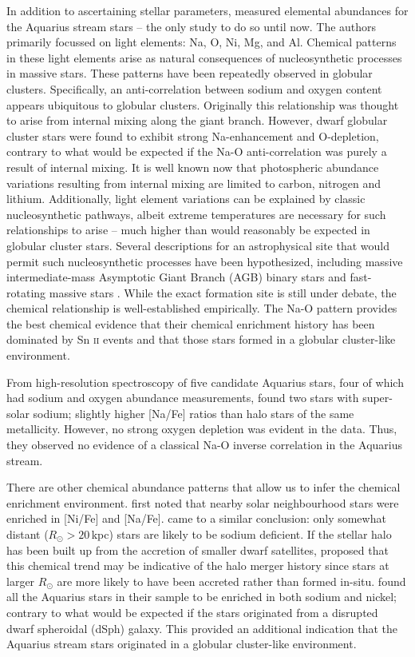\documentclass{emulateapj}
\begin{document}
In addition to ascertaining stellar parameters, \citet{wylie-de-boer;et-al_2012} measured elemental abundances for the Aquarius stream stars -- the only study to do so until now. The authors primarily focussed on light elements: Na, O, Ni, Mg, and Al. Chemical patterns in these light elements arise as natural consequences of nucleosynthetic processes in massive stars. These patterns have been repeatedly observed in globular clusters. Specifically, an anti-correlation between sodium and oxygen content appears ubiquitous to globular clusters. Originally this relationship was thought to arise from internal mixing along the giant branch. However, dwarf globular cluster stars were found to exhibit strong Na-enhancement and O-depletion, contrary to what would be expected if the Na-O anti-correlation was purely a result of internal mixing. It is well known now that photospheric abundance variations resulting from internal mixing are limited to carbon, nitrogen and lithium. Additionally, light element variations can be explained by classic nucleosynthetic pathways, albeit extreme temperatures are necessary for such relationships to arise \--- much higher than would reasonably be expected in globular cluster stars. Several descriptions for an astrophysical site that would permit such nucleosynthetic processes have been hypothesized, including massive intermediate-mass Asymptotic Giant Branch (AGB) binary stars \citep{de_mink;et-al_2009} and fast-rotating massive stars \citep{decressin;et-al_2007}. While the exact formation site is still under debate, the chemical relationship is well-established empirically. The Na-O pattern provides the best chemical evidence that their chemical enrichment history has been dominated by Sn \textsc{ii} events and that those stars formed in a globular cluster-like environment.

From high-resolution spectroscopy of five candidate Aquarius stars, four of which had sodium and oxygen abundance measurements, \citet{wylie-de-boer;et-al_2012} found two stars with super-solar sodium; slightly higher [Na/Fe] ratios than halo stars of the same metallicity. However, no strong oxygen depletion was evident in the data. Thus, they observed no evidence of a classical Na-O inverse correlation in the Aquarius stream.

There are other chemical abundance patterns that allow us to infer the chemical enrichment environment. \citet{nissen;schuster_1997} first noted that nearby solar neighbourhood stars were enriched in [Ni/Fe] and [Na/Fe]. \citet{fulbright_2000} came to a similar conclusion: only somewhat distant ($R_\odot > 20$\,kpc) stars are likely to be sodium deficient. If the stellar halo has been built up from the accretion of smaller dwarf satellites, \citet{nissen;schuster_1997} proposed that this chemical trend may be indicative of the halo merger history since stars at larger $R_\odot$ are more likely to have been accreted rather than formed in-situ. \citet{wylie-de-boer;et-al_2012} found all the Aquarius stars in their sample to be enriched in both sodium and nickel; contrary to what would be expected if the stars originated from a disrupted dwarf spheroidal (dSph) galaxy. This provided an additional indication that the Aquarius stream stars originated in a globular cluster-like environment.
\end{document}
